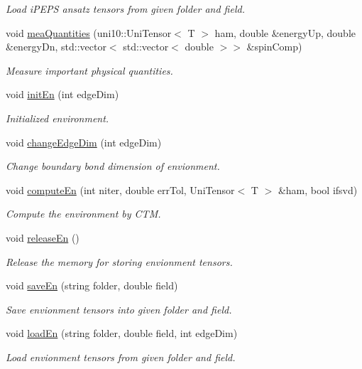 \begin{DoxyCompactItemize}
\begin{DoxyCompactList}\small\item\em Load i\+P\+E\+PS ansatz tensors from given folder and field. \end{DoxyCompactList}\item 
void \hyperlink{classpess_a24a9f46518e05043c8339ad17cb9a07e}{mea\+Quantities} (uni10\+::\+Uni\+Tensor$<$ T $>$ ham, double \&energy\+Up, double \&energy\+Dn, std\+::vector$<$ std\+::vector$<$ double $>$$>$ \&spin\+Comp)
\begin{DoxyCompactList}\small\item\em Measure important physical quantities. \end{DoxyCompactList}\item 
void \hyperlink{classpess_a89fc5debed3799c0f59441a4ad632a43}{init\+En} (int edge\+Dim)
\begin{DoxyCompactList}\small\item\em Initialized environment. \end{DoxyCompactList}\item 
void \hyperlink{classpess_aa994635ee08e0fbe5b524e19da931393}{change\+Edge\+Dim} (int edge\+Dim)
\begin{DoxyCompactList}\small\item\em Change boundary bond dimension of envionment. \end{DoxyCompactList}\item 
void \hyperlink{classpess_a7ffb2691c794a6aa3203442c853c410d}{compute\+En} (int niter, double err\+Tol, Uni\+Tensor$<$ T $>$ \&ham, bool ifsvd)
\begin{DoxyCompactList}\small\item\em Compute the environment by C\+TM. \end{DoxyCompactList}\item 
void \hyperlink{classpess_af8e3d9da9b33339ff9010b2345873862}{release\+En} ()\hypertarget{classpess_af8e3d9da9b33339ff9010b2345873862}{}\label{classpess_af8e3d9da9b33339ff9010b2345873862}

\begin{DoxyCompactList}\small\item\em Release the memory for storing envionment tensors. \end{DoxyCompactList}\item 
void \hyperlink{classpess_a0c0c94a2179d57cb8e0422f57ff3f522}{save\+En} (string folder, double field)
\begin{DoxyCompactList}\small\item\em Save envionment tensors into given folder and field. \end{DoxyCompactList}\item 
void \hyperlink{classpess_a5d2e848d856ed6150bef209f30f9d033}{load\+En} (string folder, double field, int edge\+Dim)
\begin{DoxyCompactList}\small\item\em Load envionment tensors from given folder and field. \end{DoxyCompactList}\end{DoxyCompactItemize}


